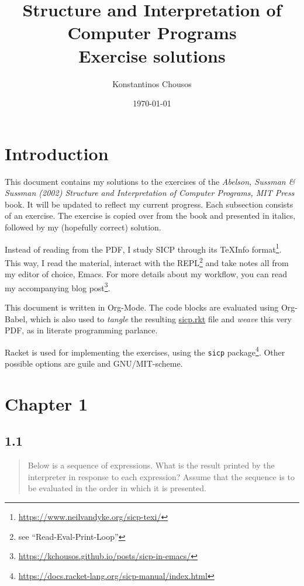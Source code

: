 \documentclass[a4paper, titlepage, twoside]{article}
\author{Konstantinos Chousos}
\date{\today}
\title{\textbf{Structure and Interpretation of Computer Programs}\\\medskip
\large Exercise solutions}
\begin{document}
\maketitle

\section*{Introduction}
\label{sec:org1a19912}

This document contains my solutions to the exercises of the \emph{Abelson, Sussman \& Sussman (2002) Structure and Interpretation of Computer Programs, MIT Press} book. It will be updated to reflect my current progress. Each subsection consists of an exercise. The exercise is copied over from the book and presented in italics, followed by my (hopefully correct) solution.

Instead of reading from the PDF, I study SICP through its TeXInfo format\footnote{\url{https://www.neilvandyke.org/sicp-texi/}}. This way, I read the material, interact with the REPL\footnote{see ``Read-Eval-Print-Loop''} and take notes all from my editor of choice, Emacs. For more details about my workflow, you can read my accompanying blog post\footnote{\url{https://kchousos.github.io/posts/sicp-in-emacs/}}.

This document is written in Org-Mode. The code blocks are evaluated using Org-Babel, which is also used to \emph{tangle} the resulting \href{./sicp.rkt}{sicp.rkt} file and \emph{weave} this very PDF, as in literate programming parlance.

Racket is used for implementing the exercises, using the \texttt{sicp} package\footnote{\url{https://docs.racket-lang.org/sicp-manual/index.html}}. Other possible options are guile and GNU/MIT-scheme.

\newpage

\section*{Chapter 1}
\label{sec:org7094ad3}

\subsection*{1.1}
\label{sec:org0965c86}

\begin{quote}
Below is a sequence of expressions. What is the result printed by the interpreter in response to each expression? Assume that the sequence is to be evaluated in the order in which it is presented.
\end{quote}
\end{document}
